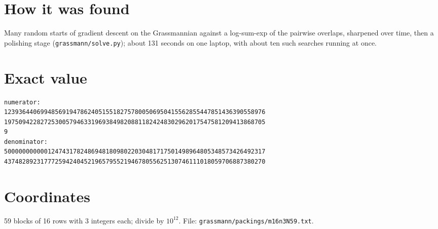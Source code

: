 \documentclass[11pt,a4paper]{article}
\begin{document}
\section{How it was found}
Many random starts of gradient descent on the Grassmannian against a log-sum-exp of the pairwise overlaps, sharpened over time, then a polishing stage (\texttt{grassmann/solve.py}); about 131 seconds on one laptop, with about ten such searches running at once.


\appendix
\section{Exact value}
{\small
\begin{verbatim}
numerator:
123936440699485691947862405155182757800506950415562855447851436390558976
197509422827253005794633196938498208811824248302962017547581209413868705
9
denominator:
500000000000124743178248694818098022030481717501498964805348573426492317
437482892317772594240452196579552194678055625130746111018059706887380270
\end{verbatim}}

\section{Coordinates}
59 blocks of 16 rows with 3 integers each; divide by $10^{12}$. File: \texttt{grassmann/packings/m16n3N59.txt}.
{\tiny
\begin{multicols}{3}
\end{multicols}}
\end{document}

